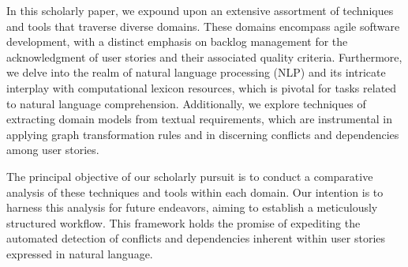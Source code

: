 In this scholarly paper, we expound upon an extensive assortment of techniques and tools that traverse diverse domains. These domains encompass agile software development, with a distinct emphasis on backlog management for the acknowledgment of user stories and their associated quality criteria. Furthermore, we delve into the realm of natural language processing (NLP) and its intricate interplay with computational lexicon resources, which is pivotal for tasks related to natural language comprehension. Additionally, we explore techniques of extracting domain models from textual requirements, which are instrumental in applying graph transformation rules and in discerning conflicts and dependencies among user stories.

The principal objective of our scholarly pursuit is to conduct a comparative analysis of these techniques and tools within each domain. Our intention is to harness this analysis for future endeavors, aiming to establish a meticulously structured workflow. This framework holds the promise of expediting the automated detection of conflicts and dependencies inherent within user stories expressed in natural language.
